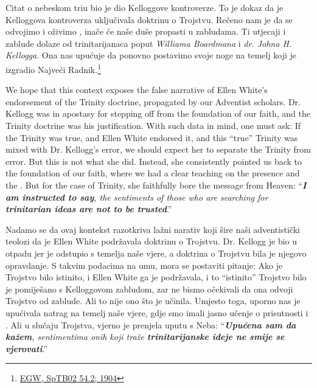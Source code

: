 Citat o nebeskom triu bio je dio Kelloggove kontroverze. To je dokaz da je Kelloggova kontroverza uključivala doktrinu o Trojstvu. Rečeno nam je da se odvojimo  i oživimo , inače će naše duše propasti u zabludama. Ti utjecaji i zablude dolaze od trinitarijanaca poput \textit{Williama Boardmana} i \textit{dr. Johna H. Kellogga}. Ona nas upućuje da ponovno postavimo svoje noge na temelj koji je izgradio Najveći Radnik.\footnote{\href{https://egwwritings.org/?ref=en_SpTB02.54.2&para=417.276}{EGW, SpTB02 54.2; 1904}}


We hope that this context exposes the false narrative of Ellen White's endorsement of the Trinity doctrine, propagated by our Adventist scholars. Dr. Kellogg was in apostasy for stepping off from the foundation of our faith, and the Trinity doctrine was his justification. With such data in mind, one must ask: If the Trinity was true, and Ellen White endorsed it, and this “true” Trinity was mixed with Dr. Kellogg's error, we should expect her to separate the Trinity from error. But this is not what she did. Instead, she consistently pointed us back to the foundation of our faith, where we had a clear teaching on the presence and the . But for the case of Trinity, she faithfully bore the message from Heaven: “\textit{\textbf{I am instructed to say}, the sentiments of those who are searching for \textbf{trinitarian ideas are not to be trusted}}.”


Nadamo se da ovaj kontekst razotkriva lažni narativ koji šire naši adventistički teolozi da je Ellen White podržavala doktrinu o Trojstvu. Dr. Kellogg je bio u otpadu jer je odstupio s temelja naše vjere, a doktrina o Trojstvu bila je njegovo opravdanje. S takvim podacima na umu, mora se postaviti pitanje: Ako je Trojstvo bilo istinito, i Ellen White ga je podržavala, i to “istinito” Trojstvo bilo je pomiješano s Kelloggovom zabludom, zar ne bismo očekivali da ona odvoji Trojstvo od zablude. Ali to nije ono što je učinila. Umjesto toga, uporno nas je upućivala natrag na temelj naše vjere, gdje smo imali jasno učenje o prisutnosti i . Ali u slučaju Trojstva, vjerno je prenjela uputu s Neba: “\textit{\textbf{Upućena sam da kažem}, sentimentima onih koji traže \textbf{trinitarijanske ideje ne smije se vjerovati}}.”





% 
